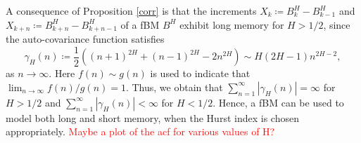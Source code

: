 A consequence of Proposition \ref{corr} is that the increments $X_{k}\coloneqq B_{k}^{H}-B_{k-1}^{H}$ and $X_{k+n}\coloneqq B_{k+n}^{H}-B_{k+n-1}^{H}$ of a fBM $B^{H}$ exhibit long memory for $H>1/2$, since the auto-covariance function satisfies
\begin{equation}\label{asymp}
\gamma_{H}(n)\coloneqq \frac{1}{2}\left((n+1)^{2H}+(n-1)^{2H}-2n^{2H}\right) \sim H(2H-1)n^{2H-2},
\end{equation}
as $n\to\infty$. Here $f(n)\sim g(n)$ is used to indicate that $\lim_{n\to\infty}f(n)/g(n)=1$. Thus, we obtain that $\sum_{n=1}^{\infty}|\gamma_{H}(n)|=\infty$ for $H>1/2$ and $\sum_{n=1}^{\infty}|\gamma_{H}(n)|<\infty$ for $H<1/2$. Hence, a fBM can be used to model both long and short memory, when the Hurst index is chosen appropriately. 
\textcolor{red}{Maybe a plot of the acf for various values of H?}
